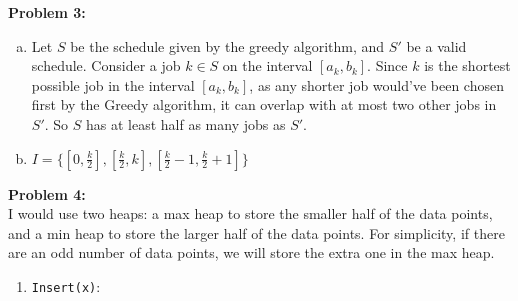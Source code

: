 \documentclass{article}
\begin{document}
\textbf{Problem 3:}
\begin{enumerate}[a)]
    \item Let $S$ be the schedule given by the greedy algorithm, and $S'$ be a valid schedule. Consider a job $k \in S$ on the interval $[a_k, b_k]$. Since $k$ is the shortest possible job in the interval $[a_k, b_k]$, as any shorter job would've been chosen first by the Greedy algorithm, it can overlap with at most two other jobs in $S'$. So $S$ has at least half as many jobs as $S'$.
    \item $I = \{[0, \frac{k}{2}], [\frac{k}{2}, k], [\frac{k}{2} - 1, \frac{k}{2} + 1]\}$
\end{enumerate} 

\textbf{Problem 4:} \\[1.0ex]
I would use two heaps: a max heap to store the smaller half of the data points, and a min heap to store the larger half of the data points. For simplicity, if there are an odd number of data points, we will store the extra one in the max heap.
\begin{enumerate}
    \item \texttt{Insert(x)}: 
\end{enumerate}
\end{document}
